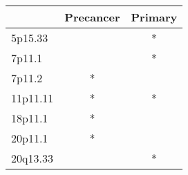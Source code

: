 \begin{tabular}{lcc}
\toprule
{} & Precancer & Primary \\
\midrule
5p15.33  &           &       * \\
7p11.1   &           &       * \\
7p11.2   &         * &         \\
11p11.11 &         * &       * \\
18p11.1  &         * &         \\
20p11.1  &         * &         \\
20q13.33 &           &       * \\
\bottomrule
\end{tabular}
